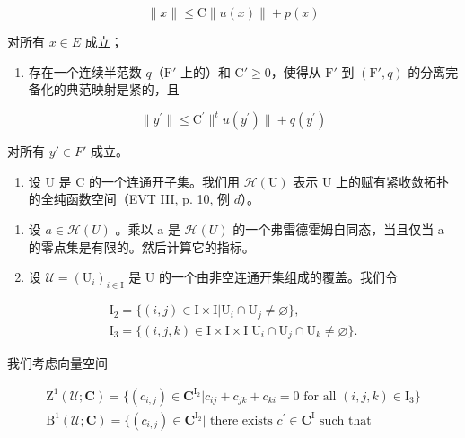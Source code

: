 \[
\| x \| \leqslant \mathrm{C} \| u (x) \| + p (x)
\]

对所有 \(x \in E\) 成立；

\begin{enumerate}
\def\labelenumi{(\roman{enumi})}
\setcounter{enumi}{1}
\tightlist
\item
  存在一个连续半范数 \(q\)（\(\mathrm{F}'\) 上的）和 \(\mathrm{C}' \geqslant 0\)，使得从 \(\mathrm{F}'\) 到 \((\mathrm{F}', q)\) 的分离完备化的典范映射是紧的，且
\end{enumerate}

\[
\| y ^ {\prime} \| \leqslant \mathrm{C} ^ {\prime} \| ^ {t} u (y ^ {\prime}) \| + q (y ^ {\prime})
\]

对所有 \(y' \in F'\) 成立。

\begin{enumerate}
\def\labelenumi{\arabic{enumi})}
\setcounter{enumi}{7}
\tightlist
\item
  设 U 是 C 的一个连通开子集。我们用 \(\mathcal{H}(\mathrm{U})\) 表示 U 上的赋有紧收敛拓扑的全纯函数空间（EVT III, p. 10, 例 \(d\)）。
\end{enumerate}

\begin{enumerate}
\def\labelenumi{\alph{enumi})}
\item
  设 \(a \in \mathcal{H}(U)\) 。乘以 a 是 \(\mathcal{H}(U)\) 的一个弗雷德霍姆自同态，当且仅当 a 的零点集是有限的。然后计算它的指标。
\item
  设 \(\mathcal{U} = (\mathrm{U}_{i})_{i \in \mathrm{I}}\) 是 U 的一个由非空连通开集组成的覆盖。我们令
\end{enumerate}

\[
\begin{array}{l} \mathrm{I} _ {2} = \{(i, j) \in \mathrm{I} \times \mathrm{I} | \mathrm{U} _ {i} \cap \mathrm{U} _ {j} \neq \varnothing \}, \\ \mathrm{I} _ {3} = \{(i, j, k) \in \mathrm{I} \times \mathrm{I} \times \mathrm{I} | \mathrm{U} _ {i} \cap \mathrm{U} _ {j} \cap \mathrm{U} _ {k} \neq \varnothing \}. \end{array}
\]

我们考虑向量空间

\[
\begin{array}{l} \mathrm{Z} ^ {1} (\mathcal {U}; \mathbf {C}) = \{(c _ {i, j}) \in \mathbf {C} ^ {\mathrm{I} _ {2}} | c _ {i j} + c _ {j k} + c _ {k i} = 0 \text { for all } (i, j, k) \in \mathrm{I} _ {3} \} \\ \mathrm{B} ^ {1} (\mathcal {U}; \mathbf {C}) = \{(c _ {i, j}) \in \mathbf {C} ^ {\mathrm{I} _ {2}} | \text { there exists } c ^ {\prime} \in \mathbf {C} ^ {\mathrm{I}} \text { such that } \end{array}
\]

